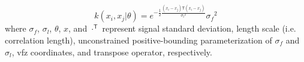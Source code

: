 \begin{equation} \label{eq:squared-exponential}
	k(x_i,x_j|\theta )=e^{-\frac{1}{2}\frac{\left(x_i-x_j\right)\mathsf{T}\left(x_i-x_j\right)}{\sigma _l{}^2}} \sigma _f{}^2
\end{equation}
where $\sigma _f$, $\sigma _l$, $\theta$, $x$, and $\cdot ^{\mathsf{T}}$ represent signal standard deviation, length scale (i.e. correlation length), unconstrained positive-bounding parameterization of $\sigma _f$ and $\sigma _l$, \gls{vfz} coordinates, and transpose operator, respectively.